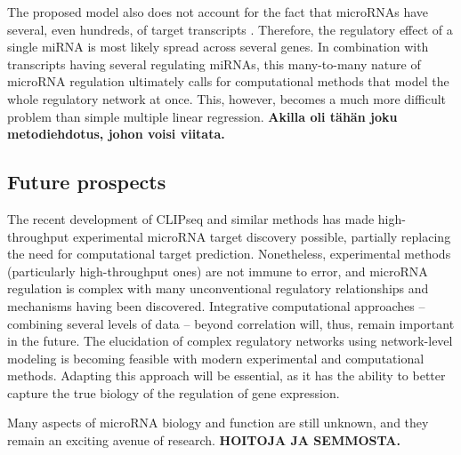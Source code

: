 The proposed model also does not account for the fact that microRNAs have
several, even hundreds, of target transcripts \citep{}. Therefore, the regulatory
effect of a single miRNA is most likely spread across several genes. In
combination with transcripts having several regulating miRNAs, this many-to-many
nature of microRNA regulation ultimately calls for computational methods
that model the whole regulatory network at once. This, however, becomes a much
more difficult problem than simple multiple linear regression. \textbf{Akilla
oli tähän joku metodiehdotus, johon voisi viitata.}

\subsection*{Future prospects}

The recent development of CLIPseq and similar methods has made high-throughput
experimental microRNA target discovery possible, partially replacing the need
for computational target prediction. Nonetheless, experimental methods
(particularly high-throughput ones) are not immune to error, and microRNA
regulation is complex with many unconventional regulatory relationships and
mechanisms having been discovered. Integrative computational approaches --
combining several levels of data -- beyond correlation will, thus, remain
important in the future. The elucidation of complex regulatory networks using
network-level modeling is becoming feasible with modern experimental and
computational methods. Adapting this approach will be essential, as it has the
ability to better capture the true biology of the regulation of gene
expression.

Many aspects of microRNA biology and function are still unknown, and they 
remain an exciting avenue of research. \textbf{HOITOJA JA SEMMOSTA.}
